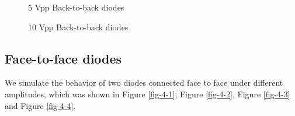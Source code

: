 \documentclass{article}
\begin{document}
\begin{figure}[!htbp]
	\centering
	\caption{5 Vpp Back-to-back diodes}
	\label{fig-3-3}
\end{figure}

\begin{figure}[!htbp]
	\centering
	\caption{10 Vpp Back-to-back diodes}
	\label{fig-3-4}
\end{figure}

\newpage
\subsection{Face-to-face diodes}
We simulate the behavior of two diodes connected face to face under different amplitudes, which was shown in Figure \ref{fig-4-1}, Figure \ref{fig-4-2}, Figure \ref{fig-4-3} and Figure \ref{fig-4-4}.
\end{document}
